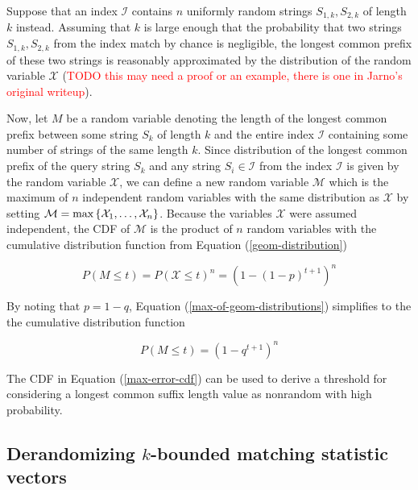 \documentclass[unnumsec,webpdf,contemporary,large]{oup-authoring-template}%
\theoremstyle{thmstyleone}%
\theoremstyle{thmstyletwo}%
\theoremstyle{thmstylethree}%
\begin{document}
Suppose that an index $\mathcal{I}$ contains $n$ uniformly random strings $S_{1,k},S_{2,k}$ of length $k$ instead. Assuming that $k$ is large enough that the probability that two strings $S_{1,k},S_{2,k}$ from the index match by chance is negligible, the longest common prefix of these two strings is reasonably approximated by the distribution of the random variable $\mathcal{X}$ (\textcolor{red}{TODO this may need a proof or an example, there is one in Jarno's original writeup}).

Now, let $M$ be a random variable denoting the length of the longest common prefix between some string $S_{k}$ of length $k$ and the entire index $\mathcal{I}$ containing some number of strings of the same length $k$. 
Since distribution of the longest common prefix of the query string $S_k$ and any string $S_i \in \mathcal{I}$ from the index $\mathcal{I}$ is given by the random variable $\mathcal{X}$, 
we can define a new random variable $\mathcal{M}$ 
which is the maximum of $n$ independent random variables with the same distribution as 
$\mathcal{X}$ by setting 
$\mathcal{M} = \text{max}\left\{\mathcal{X}_1, \text{\textellipsis}, \mathcal{X}_n\right\}$. 
Because the variables $\mathcal{X}$ were assumed independent, the CDF of $\mathcal{M}$ is the product of $n$ random variables with the cumulative distribution function from Equation (\ref{geom-distribution})

\begin{equation}
    P\left(M \leq t\right) = P\left(\mathcal{X} \leq t\right)^n = \left(1 - \left(1 - p\right)^{t + 1}\right)^n
\label{max-of-geom-distributions}    
\end{equation}

By noting that $p = 1 - q$, Equation (\ref{max-of-geom-distributions}) simplifies to the the cumulative distribution function

\begin{equation}
    P\left(M \leq t\right) = \left(1 - q^{t + 1}\right)^n
\label{max-error-cdf}
\end{equation}

The CDF in Equation (\ref{max-error-cdf}) can be used to derive a threshold for considering a longest common suffix length value as nonrandom with high probability.

\subsection{\texorpdfstring{Derandomizing $k$-bounded matching statistic vectors}{Derandomizing k-bounded matching statistic vectors}}
\end{document}
